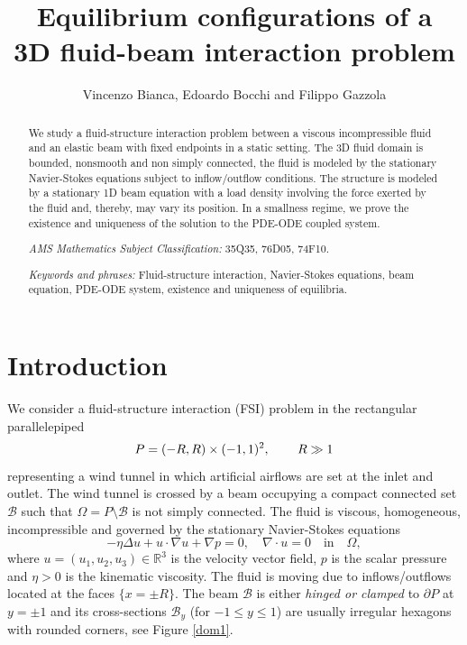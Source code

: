 \documentclass[11pt,a4paper]{amsart}
\title[Equilibrium configurations of a 3D fluid-beam interaction problem]{Equilibrium configurations of a\\ 3D fluid-beam interaction problem}
\author{Vincenzo Bianca, Edoardo Bocchi and Filippo Gazzola}
\def\neweq#1{\begin{equation}\label{#1}}
\def\endeq{\end{equation}}
\def\R{\mathbb{R}}
\theoremstyle{remark}
\theoremstyle{definition}
\numberwithin{equation}{section}
\numberwithin{proposition}{section}
\begin{document}
	
	


	\begin{abstract} We study a fluid-structure interaction problem between a viscous incompressible fluid and an elastic beam with fixed endpoints in a static setting. The 3D fluid domain is bounded, nonsmooth and non simply connected,
the fluid is modeled by the stationary Navier-Stokes equations subject to inflow/outflow conditions. The structure is modeled by a stationary 1D beam equation with a load density involving the force exerted by the fluid and, thereby, may vary its position. In a smallness regime, we prove the existence and uniqueness of the solution  to the PDE-ODE coupled system. \bigskip

\emph{AMS Mathematics Subject Classification:} 35Q35, 76D05, 74F10.\par
\emph{Keywords and phrases:} Fluid-structure interaction, Navier-Stokes equations, beam equation, PDE-ODE system, existence and uniqueness of equilibria.
\end{abstract}
	\date{}
	\maketitle
	
	\section{Introduction}
	We consider a fluid-structure interaction (FSI) problem in the rectangular parallelepiped
	$$P=(-R,R)\times(-1,1)^2,\hspace{.3in}R\gg1$$
	representing a wind tunnel in which artificial airflows are set at the inlet and outlet. The wind tunnel is crossed by a beam occupying a
	compact connected set
	$\mathcal{B}$ such that $\Omega = P\setminus\mathcal{B}$ is not simply connected. The fluid is viscous, homogeneous, incompressible and governed by the stationary Navier-Stokes equations
	\neweq{SNS}
	-\eta\Delta u+u\cdot\nabla u+\nabla p=0,\quad\nabla\cdot u=0\quad\mbox{in} \quad \Omega,
	\endeq
	where $u=(u_1,u_2,u_3)\in\R^3$ is the velocity vector field, $p$ is the scalar pressure and $\eta>0$ is the kinematic viscosity. The fluid is moving due to inflows/outflows located at the faces $\{x=\pm R\}$.
	The beam $\mathcal{B}$ is either {\em hinged or clamped} to $\partial P$ at $y=\pm1$ and its cross-sections $\mathcal{B}_y$ (for $-1\le y\le1$)
are usually irregular hexagons with
	rounded corners, see Figure \ref{dom1}.
	
\end{document}
